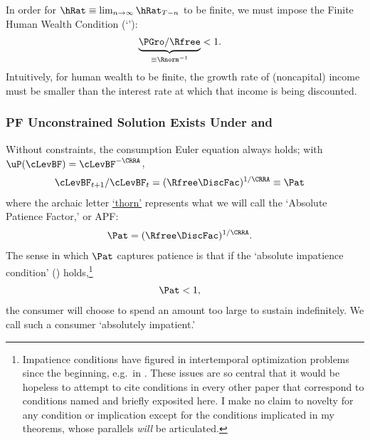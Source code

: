 \documentclass[BufferStockTheory]{subfiles}
\begin{document}
\hypertarget{FHWC}{}
In order for $\hRat \equiv \lim_{n \rightarrow
  \infty} \hRat_{T-n}$ to be finite, we must
impose the Finite Human Wealth Condition (`\FHWC'): 
\begin{align}
  \underbrace{\PGro/\Rfree}_{\equiv \Rnorm^{-1}}  & < 1 \label{eq:FHWC}.
\end{align}
Intuitively, for human wealth to be finite, the growth rate of (noncapital) income must be smaller than the interest rate at which that income is being discounted.

\hypertarget{Unconstrained-Solution}{}
\hypertarget{PF-Unconstrained-Solution}{}
\subsubsection{PF Unconstrained Solution Exists Under {\RIC} and {\FHWC}} \label{subsec:PFUncon}

\hypertarget{APF}{}
\hypertarget{AIC}{}

Without constraints, the consumption Euler equation always holds; with $\uP(\cLevBF)=\cLevBF^{-\CRRA}$, \hypertarget{Pat}{}
\begin{align}
  \cLevBF_{t+1}/\cLevBF_{t}  & = (\Rfree\DiscFac)^{1/\CRRA} \equiv \Pat   \label{eq:Pat}
\end{align}
where the archaic letter \href{https://en.wikipedia.org/wiki/Thorn_(letter)}{`thorn'} represents what we will call the `Absolute Patience Factor,' or APF:
\begin{align}
  \Pat & = (\Rfree\DiscFac)^{1/\CRRA} \label{eq:APF}.
\end{align}
The sense in which $\Pat$ captures patience is that if the `absolute impatience condition' (\AIC) holds,\footnote{Impatience conditions have figured in intertemporal optimization problems since the beginning, e.g.\ in \cite{ramseySave}.  These issues are so central that it would be hopeless to attempt to cite conditions in every other paper that correspond to conditions named and briefly exposited here.  I make no claim to novelty for any condition or implication except for the conditions implicated in my theorems, whose parallels \textit{will} be articulated.}
\begin{align}
  \label{eq:AIC}
  \Pat  & < 1,
\end{align}
the consumer will choose to spend an amount too large to sustain indefinitely.  We call such a consumer `absolutely impatient.'\hypertarget{RPF}{}
\end{document}
